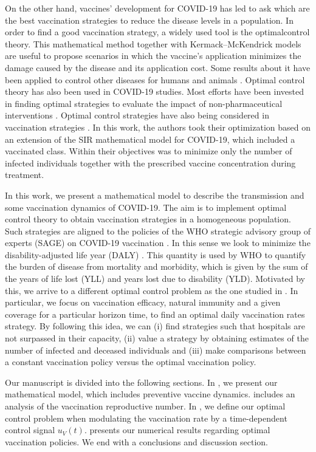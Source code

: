     On the other hand, vaccines' development for COVID-19 has led to ask which
are the best vaccination strategies to reduce the disease levels in a
population. In order to find a good vaccination strategy, a widely used tool is
the optimalcontrol theory. This mathematical method together with
Kermack--McKendrick models are useful to propose scenarios in which the
vaccine's application minimizes the damage caused by the disease and its
application cost. Some results about it have been applied to control other
diseases for humans and animals
\cite{Asano2008,Rodrigues2014,Malik2016,Jaberi2014}. Optimal control theory has
also been used in COVID-19 studies. Most efforts have been invested in finding
optimal strategies to evaluate the impact of non-pharmaceutical interventions
\cite{Madubueze2020,Perkins2020,Ullah2020}. Optimal control strategies have
also being considered in vaccination strategies \cite{Barbosa2020}. In this
work, the authors took their optimization based on an extension of the SIR
mathematical model for COVID-19, which included a vaccinated class. Within
their objectives was to minimize only the number of infected individuals
together with the prescribed vaccine concentration during treatment.

    In this work, we present a mathematical model to describe the transmission
and some vaccination dynamics of COVID-19. The aim is to implement optimal
control theory to obtain vaccination strategies in a homogeneous population.
Such strategies are aligned to the policies of the WHO strategic advisory group
of experts (SAGE) on COVID-19 vaccination \cite{sage2020}. In this sense we
look to minimize the disability-adjusted life year (DALY) \cite{WhoDALY}. This
quantity is used by WHO to quantify the burden of disease from mortality and
morbidity, which is given by the sum of the years of life lost (YLL) and years
lost due to disability (YLD). Motivated by this, we arrive to a different
optimal control problem as the one studied in \cite{Barbosa2020}. In
particular, we focus on vaccination efficacy, natural immunity and a given
coverage for a particular horizon time, to find an optimal daily vaccination
rates strategy. By following this idea, we can (i) find strategies such that
hospitals are not surpassed in their capacity, (ii) value a strategy by
obtaining estimates of the number of infected and deceased individuals and
(iii) make comparisons between a constant vaccination policy versus the optimal
vaccination policy.

    Our manuscript is divided into the following sections.
In , we present our mathematical model,
which includes preventive vaccine dynamics.  includes an
analysis of the vaccination reproductive number. In
, we define our optimal control problem when
modulating the vaccination rate by a time-dependent control signal $u_V(t)$.
 presents our numerical results regarding optimal
vaccination policies. We end with a conclusions and discussion section.